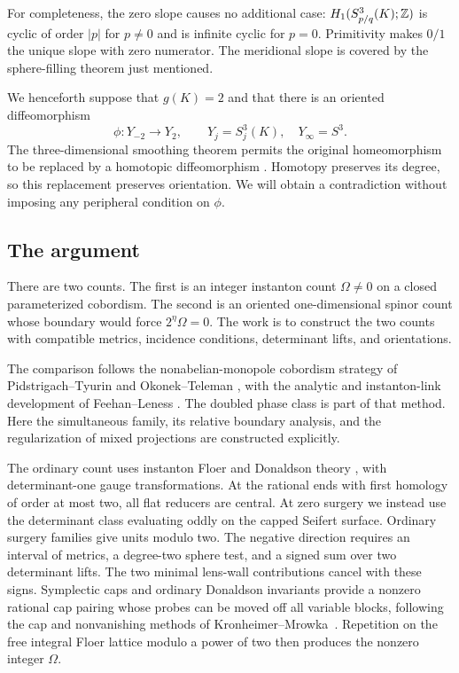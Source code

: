 For completeness, the zero slope causes no additional case:
$H_1(S^3_{p/q}(K);\mathbb Z)$ is cyclic of order $|p|$ for $p\ne0$ and is
infinite cyclic for $p=0$. Primitivity makes $0/1$ the unique slope with
zero numerator. The meridional slope is covered by the sphere-filling
theorem just mentioned.

We henceforth suppose that $g(K)=2$ and that there is an oriented
diffeomorphism
\begin{equation}\label{eq:introduction:cosmetic}
 \phi:Y_{-2}\longrightarrow Y_2,
 \qquad Y_j=S^3_j(K),\quad Y_\infty=S^3.
\end{equation}
The three-dimensional smoothing theorem permits the original
homeomorphism to be replaced by a homotopic diffeomorphism
\cite[Theorem~2.3]{Massuyeau2011}.  Homotopy preserves its degree,
so this replacement preserves orientation.  We will obtain a
contradiction without imposing any peripheral condition on $\phi$.

\subsection{The argument}

There are two counts. The first is an integer instanton count
$\Omega\ne0$ on a closed parameterized cobordism. The second is an
oriented one-dimensional spinor count whose boundary would force
$2^\eta\Omega=0$. The work is to construct the two counts with compatible
metrics, incidence conditions, determinant lifts, and orientations.

The comparison follows the nonabelian-monopole cobordism strategy of
Pidstrigach--Tyurin and Okonek--Teleman
\cite{PidstrigachTyurin1995,OkonekTeleman1996}, with the analytic and
instanton-link development of Feehan--Leness
\cite{FeehanLenessPU2I,FeehanLenessPU2II,FeehanLenessLinksI}.
The doubled phase class is part of that method.  Here the simultaneous
family, its relative boundary analysis, and the regularization of
mixed projections are constructed explicitly.

The ordinary count uses instanton Floer and Donaldson theory
\cite{Floer1988,Donaldson2002,DonaldsonKronheimer1990}, with
determinant-one gauge transformations.
At the rational ends with first homology of order at most two, all flat
reducers are central. At zero surgery we instead use the determinant
class evaluating oddly on the capped Seifert surface. Ordinary surgery
families give units modulo two. The negative direction requires an
interval of metrics, a degree-two sphere test, and a signed sum over two
determinant lifts. The two minimal lens-wall contributions cancel with
these signs. Symplectic caps and ordinary Donaldson invariants provide a
nonzero rational cap pairing whose probes can be moved off all variable
blocks, following the cap and nonvanishing methods of
Kronheimer--Mrowka~\cite{KronheimerMrowka2004,KronheimerMrowka1995}.
Repetition on the free integral Floer lattice modulo a power of
two then produces the nonzero integer $\Omega$.

